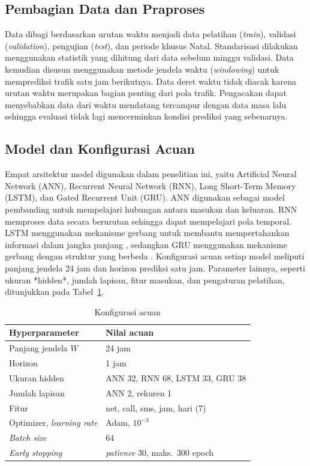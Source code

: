 \documentclass[conference,a4paper]{IEEEtran}
\begin{document}
\subsection{Pembagian Data dan Praproses}
Data dibagi berdasarkan urutan waktu menjadi data pelatihan (\textit{train}), validasi (\textit{validation}), pengujian (\textit{test}), dan periode khusus Natal. Standarisasi dilakukan menggunakan statistik yang dihitung dari data sebelum minggu validasi. Data kemudian disusun menggunakan metode jendela waktu (\textit{windowing}) untuk memprediksi trafik satu jam berikutnya. Data deret waktu tidak diacak karena urutan waktu merupakan bagian penting dari pola trafik. Pengacakan dapat menyebabkan data dari waktu mendatang tercampur dengan data masa lalu sehingga evaluasi tidak lagi mencerminkan kondisi prediksi yang sebenarnya.

\subsection{Model dan Konfigurasi Acuan}
Empat arsitektur model digunakan dalam penelitian ini, yaitu Artificial Neural Network (ANN), Recurrent Neural Network (RNN), Long Short-Term Memory (LSTM), dan Gated Recurrent Unit (GRU). ANN digunakan sebagai model pembanding untuk mempelajari hubungan antara masukan dan keluaran. RNN memproses data secara berurutan sehingga dapat mempelajari pola temporal. LSTM menggunakan mekanisme gerbang untuk membantu mempertahankan informasi dalam jangka panjang \cite{hochreiter1997lstm}, sedangkan GRU menggunakan mekanisme gerbang dengan struktur yang berbeda \cite{cho2014gru}. Konfigurasi acuan setiap model meliputi panjang jendela 24 jam dan horizon prediksi satu jam. Parameter lainnya, seperti ukuran *hidden*, jumlah lapisan, fitur masukan, dan pengaturan pelatihan, ditunjukkan pada Tabel~\ref{tab:acuan}.

\begin{table}[t]
  \centering
  \caption{Konfigurasi acuan}
  \label{tab:acuan}
  \begin{tabular}{@{}ll@{}}
    \toprule
    Hyperparameter & Nilai acuan \\
    \midrule
    Panjang jendela $W$ & 24 jam \\
    Horizon & 1 jam \\
    Ukuran hidden & ANN 32, RNN 68, LSTM 33, GRU 38 \\
    Jumlah lapisan & ANN 2, rekuren 1 \\
    Fitur & net, call, sms, jam, hari (7) \\
    Optimizer, \textit{learning rate} & Adam, $10^{-3}$ \\
    \textit{Batch size} & 64 \\
    \textit{Early stopping} & \textit{patience} 30, maks.\ 300 epoch \\
    \bottomrule
  \end{tabular}
\end{table}
\end{document}
